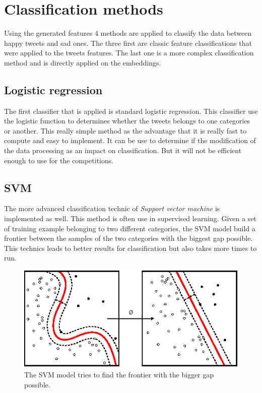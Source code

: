 \section{Classification methods}
Using the generated features 4 methods are applied to classify the data between happy tweets and sad ones. The three first are classic feature classifications that were applied to the tweets features. The last one is a more complex classification method and is directly applied on the embeddings.

\subsection{Logistic regression}
The first classifier that is applied is standard logistic regression. This classifier use the logistic function to determines whether the tweets belongs to one categories or another. This really simple method as the advantage that it is really fast to compute and easy to implement. It can be use to determine if the modification of the data processing as an impact on classification. But it will not be efficient enough to use for the competitions.

\subsection{SVM}
The more advanced classification technic of \textit{Support vector machine} is implemented as well. This method is often use in supervised learning. Given a set of training example belonging to two different categories, the SVM model build a frontier between the samples of the two categories with the biggest gap possible. This technics leads to better results for classification but also takes more times to run. 

\begin{figure}[h!]
\centering
	\includegraphics[scale=1.2]{SVM} 
\caption{The SVM model tries to find the frontier with the bigger gap possible.}
\label{plot:SVM}
\end{figure}
\FloatBarrier

